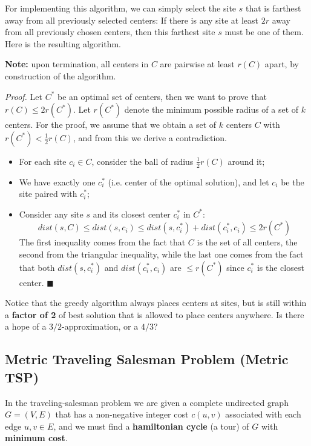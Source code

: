 For implementing this algorithm, we can simply select the site $s$ that is farthest away from all previously selected centers: If there is any site at least $2r$ away from all previously chosen centers, then this farthest site $s$ must be one of them. Here is the resulting algorithm.


\textbf{Note:} upon termination, all centers in $C$ are pairwise at least $r(C)$ apart, by construction of the algorithm.



\textit{Proof.} Let $C^*$ be an optimal set of centers, then we want to prove that $r(C) \leq 2r(C^*)$. Let $r(C^*)$ denote the minimum possible radius of a set of $k$ centers. For the proof, we assume that we obtain a set of $k$ centers $C$ with $r(C^*) < \frac{1}{2}r(C)$, and from this we derive a contradiction.

\begin{itemize}
    \item For each site $c_i \in C$, consider the ball of radius $\frac{1}{2}r(C)$ around it;
    \item We have exactly one $c_i^*$ (i.e. center of the optimal solution), and let $c_i$ be the site paired with $c_i^*$; 
    \item Consider any site $s$ and its closest center $c_i^*$ in $C^*$:
    $$
    dist(s,C) \leq dist(s, c_i) \leq dist(s,c_i^*) + dist(c_i^*, c_i) \leq 2r(C^*)
    $$
    The first inequality comes from the fact that $C$ is the set of all centers, the second from the triangular inequality, while the last one comes from the fact that both $dist(s,c_i^*)$ and $dist(c_i^*, c_i)$ are $\leq r(C^*)$ since $c_i^*$ is the closest center. $\blacksquare$
\end{itemize}

Notice that the greedy algorithm always places centers at sites, but is still within a \textbf{factor of 2} of best solution that is allowed to place centers anywhere. Is there a hope of a $3/2$-approximation, or a $4/3$?


\subsection{Metric Traveling Salesman Problem (Metric TSP)}
In the traveling-salesman problem we are given a complete undirected graph $G = (V,E)$ that has a non-negative integer cost $c(u,v)$ associated with each edge $u,v \in E$, and we must find a \textbf{hamiltonian cycle} (a tour) of $G$ with \textbf{minimum cost}.

